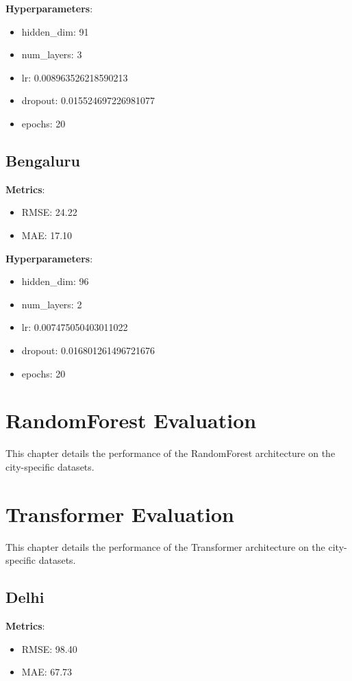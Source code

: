 \documentclass[12pt,a4paper]{book}
\begin{document}
\textbf{Hyperparameters}:
\begin{itemize}
    \item hidden\_dim: 91
    \item num\_layers: 3
    \item lr: 0.008963526218590213
    \item dropout: 0.015524697226981077
    \item epochs: 20
\end{itemize}

\section{Bengaluru}
\textbf{Metrics}:
\begin{itemize}
    \item RMSE: 24.22
    \item MAE: 17.10
\end{itemize}

\textbf{Hyperparameters}:
\begin{itemize}
    \item hidden\_dim: 96
    \item num\_layers: 2
    \item lr: 0.007475050403011022
    \item dropout: 0.016801261496721676
    \item epochs: 20
\end{itemize}

\chapter{RandomForest Evaluation}
This chapter details the performance of the RandomForest architecture on the city-specific datasets.

\chapter{Transformer Evaluation}
This chapter details the performance of the Transformer architecture on the city-specific datasets.

\section{Delhi}
\textbf{Metrics}:
\begin{itemize}
    \item RMSE: 98.40
    \item MAE: 67.73
\end{itemize}
\end{document}
